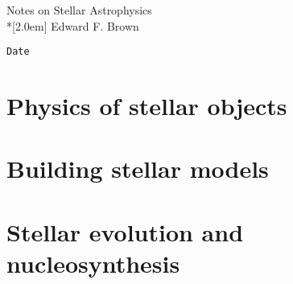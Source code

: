 \documentclass[11pt]{book}
\begin{document}
\newcommand{\thetitle}{Notes on Stellar Astrophysics}
\newcommand{\theauthor}{Edward F. Brown}

\begin{titlepage}
\vspace*{2.5in}
\begin{center}
\LARGE{\thetitle}\\*[2.0em]
\large{\theauthor}
\end{center}
\vspace*{3.0in}
\small{\verb$Date$}
\end{titlepage}

\tableofcontents

\part{Physics of stellar objects}





\part{Building stellar models}


\part{Stellar evolution and nucleosynthesis}





\appendix



\end{document}
